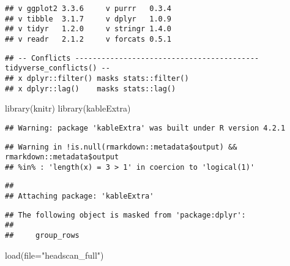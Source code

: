 \documentclass[
]{article}
\newenvironment{Shaded}{\begin{snugshade}}{\end{snugshade}}
\newcommand{\AttributeTok}[1]{\textcolor[rgb]{0.77,0.63,0.00}{#1}}
\newcommand{\FunctionTok}[1]{\textcolor[rgb]{0.00,0.00,0.00}{#1}}
\newcommand{\NormalTok}[1]{#1}
\newcommand{\StringTok}[1]{\textcolor[rgb]{0.31,0.60,0.02}{#1}}
\begin{document}
\begin{verbatim}
## v ggplot2 3.3.6     v purrr   0.3.4
## v tibble  3.1.7     v dplyr   1.0.9
## v tidyr   1.2.0     v stringr 1.4.0
## v readr   2.1.2     v forcats 0.5.1
\end{verbatim}

\begin{verbatim}
## -- Conflicts ------------------------------------------ tidyverse_conflicts() --
## x dplyr::filter() masks stats::filter()
## x dplyr::lag()    masks stats::lag()
\end{verbatim}

\begin{Shaded}
\begin{Highlighting}[]
\FunctionTok{library}\NormalTok{(knitr)}
\FunctionTok{library}\NormalTok{(kableExtra)}
\end{Highlighting}
\end{Shaded}

\begin{verbatim}
## Warning: package 'kableExtra' was built under R version 4.2.1
\end{verbatim}

\begin{verbatim}
## Warning in !is.null(rmarkdown::metadata$output) && rmarkdown::metadata$output
## %in% : 'length(x) = 3 > 1' in coercion to 'logical(1)'
\end{verbatim}

\begin{verbatim}
## 
## Attaching package: 'kableExtra'
\end{verbatim}

\begin{verbatim}
## The following object is masked from 'package:dplyr':
## 
##     group_rows
\end{verbatim}

\begin{Shaded}
\begin{Highlighting}[]
\FunctionTok{load}\NormalTok{(}\AttributeTok{file=}\StringTok{"headscan\_full"}\NormalTok{)}
\end{Highlighting}
\end{Shaded}
\end{document}
